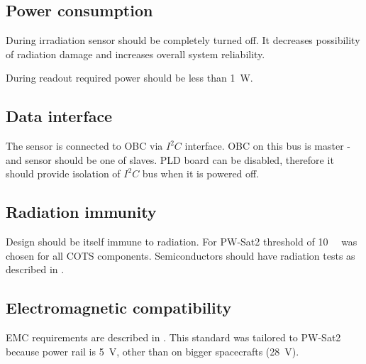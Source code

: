     \subsection{Power consumption}
        During irradiation sensor should be completely turned off. It decreases possibility of radiation damage and increases overall system reliability.

        During readout required power should be less than \SI{1}{W}.

    \subsection{Data interface}
        The sensor is connected to OBC via $I^2C$ interface. OBC on this bus is master - and sensor should be one of slaves. PLD board can be disabled, therefore it should provide isolation of $I^2C$ bus when it is powered off.

    \subsection{Radiation immunity}
        Design should be itself immune to radiation. For PW-Sat2 threshold of \SI{10}{\kilo\rad} was chosen for all COTS components. Semiconductors should have radiation tests as described in \cite{ESCIES_TID_test_method}.

    \subsection{Electromagnetic compatibility}
        EMC requirements are described in \cite{ECSS_E_ST_20_07C}. This standard was tailored to PW-Sat2 because power rail is \SI{+5}{\volt}, other than on bigger spacecrafts (\SI{+28}{\volt}).

